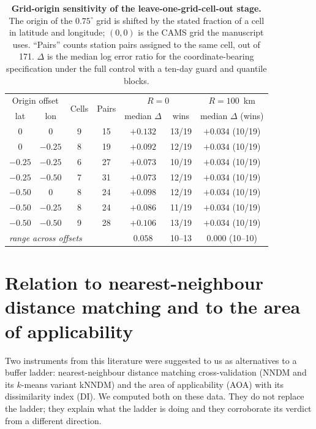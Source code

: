 \documentclass[11pt]{article}
\begin{document}
\begin{table}[htbp]\centering\footnotesize
\caption{\textbf{Grid-origin sensitivity of the leave-one-grid-cell-out stage.} The origin of the $0.75^\circ$ grid is shifted by the stated fraction of a cell in latitude and longitude; $(0,0)$ is the CAMS grid the manuscript uses. ``Pairs'' counts station pairs assigned to the same cell, out of 171. $\Delta$ is the median log error ratio for the coordinate-bearing specification under the full control with a ten-day guard and quantile blocks.}
\label{si:t26}
\begin{tabular}{ccccccc}\toprule
\multicolumn{2}{c}{Origin offset} & \multirow{2}{*}{Cells} & \multirow{2}{*}{Pairs} & \multicolumn{2}{c}{$R=0$} & $R=100$~km \\
lat & lon & & & median $\Delta$ & wins & median $\Delta$ (wins) \\ \midrule
$0$ & $0$ & 9 & 15 & $+0.132$ & 13/19 & $+0.034$ (10/19) \\
$0$ & $-0.25$ & 8 & 19 & $+0.092$ & 12/19 & $+0.034$ (10/19) \\
$-0.25$ & $-0.25$ & 6 & 27 & $+0.073$ & 10/19 & $+0.034$ (10/19) \\
$-0.25$ & $-0.50$ & 7 & 31 & $+0.073$ & 12/19 & $+0.034$ (10/19) \\
$-0.50$ & $0$ & 8 & 24 & $+0.098$ & 12/19 & $+0.034$ (10/19) \\
$-0.50$ & $-0.25$ & 8 & 24 & $+0.086$ & 11/19 & $+0.034$ (10/19) \\
$-0.50$ & $-0.50$ & 9 & 28 & $+0.106$ & 13/19 & $+0.034$ (10/19) \\ \midrule
\multicolumn{4}{l}{\textit{range across offsets}} & $0.058$ & 10--13 & $0.000$ (10--10) \\
\bottomrule\end{tabular}\end{table}

\section{Relation to nearest-neighbour distance matching and to the area of applicability}
Two instruments from this literature were suggested to us as alternatives to a buffer
ladder: nearest-neighbour distance matching cross-validation (NNDM and its $k$-means
variant kNNDM) and the area of applicability (AOA) with its dissimilarity index (DI). We
computed both on these data. They do not replace the ladder; they explain what the ladder
is doing and they corroborate its verdict from a different direction.
\end{document}
